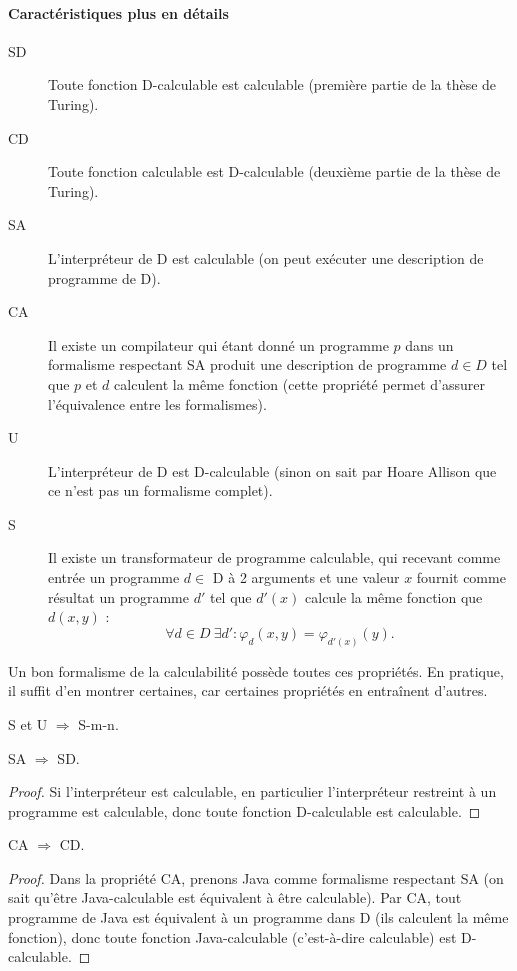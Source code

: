 \paragraph{Caractéristiques plus en détails}
\begin{description}
	\item[SD]  Toute fonction D-calculable est calculable (première partie de la thèse de Turing).
	\item[CD]  Toute fonction calculable est D-calculable (deuxième partie de la thèse de Turing).
	\item[SA]  L'interpréteur de D est calculable (on peut exécuter une description de programme de D).
	\item[CA]  Il existe un compilateur qui étant donné un programme $p$ dans un formalisme respectant SA produit une description de programme $d \in D$ tel que $p$ et $d$ calculent la même fonction (cette propriété permet d'assurer l'équivalence entre les formalismes).
	\item[U]  L'interpréteur de D est D-calculable (sinon on sait par Hoare Allison que ce n'est pas un formalisme complet).
	\item[S] Il existe un transformateur de programme calculable, qui recevant comme entrée un programme $d \in$ D à 2 arguments et une valeur $x$ fournit comme résultat un programme $d'$ tel que $d'(x)$ calcule la même fonction que $d(x,y)$ :
$$\forall d\in D\ \exists d'\colon \varphi_d(x,y)=\varphi_{d'(x)}(y).$$
\end{description}
Un bon formalisme de la calculabilité possède toutes ces propriétés. En pratique, il suffit d'en montrer certaines, car certaines propriétés en entraînent d'autres.

\begin{myprop}
S et U $\Rightarrow$ S-m-n.
\end{myprop}

\begin{myprop}
SA $\Rightarrow$ SD.
    
\begin{proof}
Si l'interpréteur est calculable, en particulier l'interpréteur restreint à un programme est calculable, donc toute fonction D-calculable est calculable.
\end{proof}
\end{myprop}

\begin{myprop}
CA $\Rightarrow$ CD.
    
\begin{proof}
Dans la propriété CA, prenons Java comme formalisme respectant SA (on sait qu'être Java-calculable est équivalent à être calculable). Par CA, tout programme de Java est équivalent à un programme dans D (ils calculent la même fonction), donc toute fonction Java-calculable (c'est-à-dire calculable) est D-calculable.
\end{proof}
\end{myprop}

